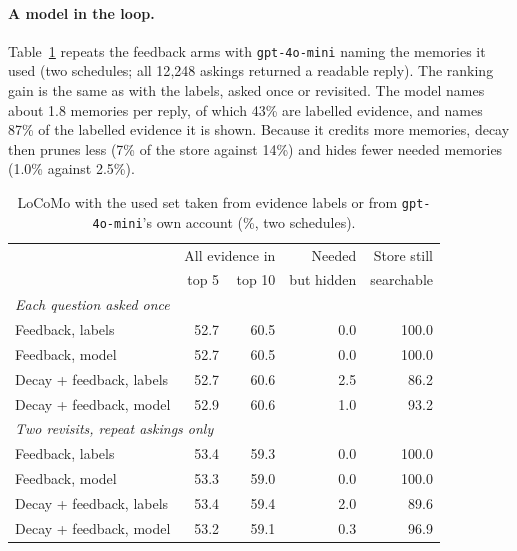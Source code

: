 \documentclass[11pt]{article}
\begin{document}
\paragraph{A model in the loop.} Table~\ref{tab:model} repeats the
feedback arms with \texttt{gpt-4o-mini} naming the memories it used
(two schedules; all 12{,}248 askings returned a readable reply). The
ranking gain is the same as with the labels, asked once or revisited.
The model names about 1.8 memories per reply, of which 43\% are
labelled evidence, and names 87\% of the labelled evidence it is
shown. Because it credits more memories, decay then prunes less (7\%
of the store against 14\%) and hides fewer needed memories (1.0\%
against 2.5\%).

\begin{table}[t]
\centering
\small
\begin{tabular}{lrrrr}
\toprule
 & \multicolumn{2}{c}{All evidence in} & Needed & Store still \\
 & top 5 & top 10 & but hidden & searchable \\
\midrule
\multicolumn{5}{l}{\emph{Each question asked once}} \\
Feedback, labels & 52.7 & 60.5 & 0.0 & 100.0 \\
Feedback, model & 52.7 & 60.5 & 0.0 & 100.0 \\
Decay + feedback, labels & 52.7 & 60.6 & 2.5 & 86.2 \\
Decay + feedback, model & 52.9 & 60.6 & 1.0 & 93.2 \\
\midrule
\multicolumn{5}{l}{\emph{Two revisits, repeat askings only}} \\
Feedback, labels & 53.4 & 59.3 & 0.0 & 100.0 \\
Feedback, model & 53.3 & 59.0 & 0.0 & 100.0 \\
Decay + feedback, labels & 53.4 & 59.4 & 2.0 & 89.6 \\
Decay + feedback, model & 53.2 & 59.1 & 0.3 & 96.9 \\
\bottomrule
\end{tabular}
\caption{LoCoMo with the used set taken from evidence labels or from
\texttt{gpt-4o-mini}'s own account (\%, two schedules).}
\label{tab:model}
\end{table}
\end{document}
